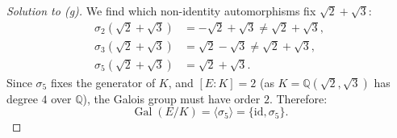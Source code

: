 \begin{proof}[Solution to (g)]
    We find which non-identity automorphisms fix $\sqrt{2} + \sqrt{3}$:
    \begin{align*}
        \sigma_2(\sqrt{2} + \sqrt{3}) &= -\sqrt{2} + \sqrt{3} \neq \sqrt{2} + \sqrt{3}, \\
        \sigma_3(\sqrt{2} + \sqrt{3}) &= \sqrt{2} - \sqrt{3} \neq \sqrt{2} + \sqrt{3}, \\
        \sigma_5(\sqrt{2} + \sqrt{3}) &= \sqrt{2} + \sqrt{3}.
    \end{align*}
    Since $\sigma_5$ fixes the generator of $K$, and $[E:K] = 2$ (as $K = \mathbb Q(\sqrt{2}, \sqrt{3})$ has degree $4$ over $\mathbb Q$), the Galois group must have order $2$. Therefore:
    \[
        \operatorname{Gal}(E/K) = \langle \sigma_5 \rangle = \{\text{id}, \sigma_5\}.
    \]
\end{proof}

